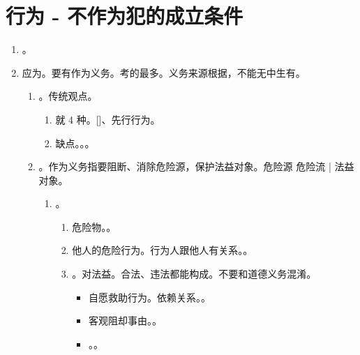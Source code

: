 \section{行为 - 不作为犯的成立条件}
\begin{enumerate}
  \item {}。
  \item 应为。要有作为义务。考的最多。义务来源根据，不能无中生有。
        \begin{enumerate}
          \item {}。传统观点。
                \begin{enumerate}
                  \item 就 4 种。[]、先行行为。
                  \item 缺点。。。
                \end{enumerate}
          \item {}。作为义务指要阻断、消除危险源，保护法益对象。危险源 \yjt 危险流 \yjt| 法益对象。
                \begin{enumerate}
                  \item {}。
                        \begin{enumerate}
                          \item 危险物。。
                          \item 他人的危险行为。行为人跟他人有关系。。
                          \item {}。对法益。合法、违法都能构成。不要和道德义务混淆。
                                \begin{itemize}
                                  \item 自愿救助行为。依赖关系。。
                                  \item 客观阻却事由。。
                                  \item {}。。
                                \end{itemize}
                        \end{enumerate}

\end{enumerate}
\end{enumerate}
\end{enumerate}
